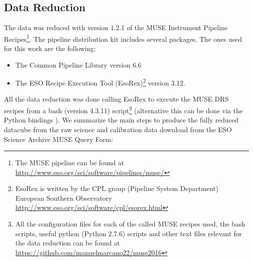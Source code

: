 \subsection{Data Reduction}

The data was reduced with version 1.2.1 of the MUSE Instrument Pipeline Recipes\footnote{The MUSE pipeline can be found at \url{http://www.eso.org/sci/software/pipelines/muse/}}\citep{weilbacher_design_2012}. The pipeline distribution kit includes several packages. The ones used for this work are the following:

\begin{itemize}
        \item The Common Pipeline Library version 6.6 \citep{mckay_common_2004}
        \item The ESO Recipe Execution Tool (EsoRex)\footnote{EsoRex is written by the CPL group (Pipeline System Department) European Southern Observatory \url{http://www.eso.org/sci/software/cpl/esorex.html}} version 3.12.
\end{itemize}

All the data reduction was done calling EsoRex to execute the MUSE DRS recipes from a bash (version 4.3.11) script\footnote{All the configuration files for each of the called MUSE recipes used, the bash scripts, useful python (Python 2.7.6) scripts and other text files relevant for the data reduction can be found at \url{https://github.com/manuelmarcano22/muse2016}} (alternative this can be done via the Python bindings \citep{streicher_python_2012}). We summarize the main steps to produce the fully reduced datacube from the raw science and calibration data download from the ESO Science Archive MUSE Query Form: 

